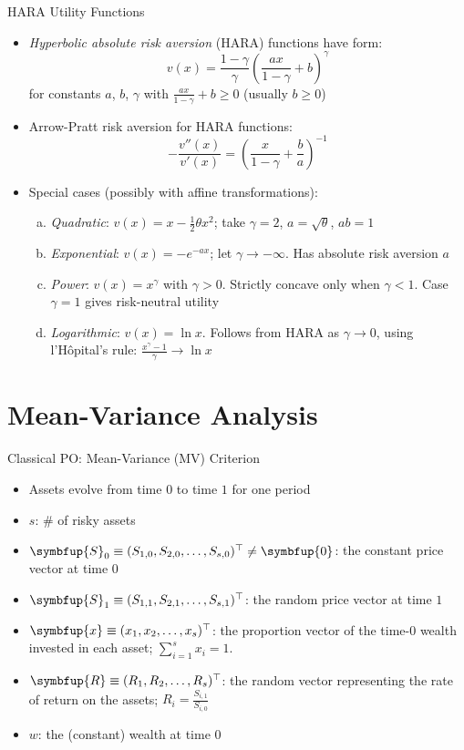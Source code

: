 \documentclass[10pt,handout]{beamer}
\newcommand{\ds}{\displaystyle}
\newcommand{\vx}{\symbfup{x}}
\newcommand{\vS}{\symbfup{S}}
\newcommand{\vR}{\symbfup{R}}
\newcommand{\vZero}{\symbfup{0}}
\theoremstyle{definition}
\begin{document}
\begin{frame}{HARA Utility Functions}
  \begin{itemize}[<+->]
    \item \emph{Hyperbolic absolute risk aversion} (HARA) functions have form:
      \[v(x) = \frac{1-\gamma}{\gamma}\left(\frac{ax}{1-\gamma} + b\right)^\gamma\]
      for constants $a$, $b$, $\gamma$ with $\ds\frac{ax}{1-\gamma} + b \geqslant 0$ (usually $b \geqslant 0$)
    \item Arrow-Pratt risk aversion for HARA functions:
      \[-\frac{v''(x)}{v'(x)} = \left(\frac{x}{1-\gamma} + \frac{b}{a}\right)^{-1}\]
    \item Special cases (possibly with affine transformations):
      \begin{enumerate}[(a)]
        \item \emph{Quadratic}: $v(x) = x - \frac{1}{2}\theta x^2$; take $\gamma = 2$, $a = \sqrt{\theta}$, $ab = 1$
        \item \emph{Exponential}: $v(x) = -e^{-ax}$; let $\gamma \to -\infty$. Has absolute risk aversion $a$
        \item \emph{Power}: $v(x) = x^\gamma$ with $\gamma > 0$. Strictly concave only when $\gamma < 1$. Case $\gamma = 1$ gives risk-neutral utility
        \item \emph{Logarithmic}: $v(x) = \ln x$. Follows from HARA as $\gamma \to 0$, using l'Hôpital's rule: $\ds\frac{x^\gamma - 1}{\gamma} \to \ln x$
      \end{enumerate}
  \end{itemize}
\end{frame}

\section{Mean-Variance Analysis}

\begin{frame}{Classical PO: Mean-Variance (MV) Criterion}
  \begin{itemize}[<+->]
    \item Assets evolve from time $0$ to time $1$ for one period
    \item $s$: \# of risky assets 
    \item $\vS_0\equiv(S_{1, 0}, S_{2, 0}, \ldots, S_{s, 0})^\top\not=\vZero$: the constant price vector at time $0$
    \item $\vS_1\equiv(S_{1, 1}, S_{2, 1}, \ldots, S_{s, 1})^\top$: the random price vector at time $1$
    \item $\vx\equiv(x_1, x_2, \ldots, x_s)^\top$: the proportion vector of the time-$0$ wealth invested in each asset; $\ds\sum_{i=1}^s x_i = 1$.
    \item $\vR\equiv(R_1, R_2, \ldots, R_s)^\top$: the random vector representing the rate of return on the assets; $\ds R_i = \frac{S_{i, 1}}{S_{i, 0}}$
    \item $w$: the (constant) wealth at time $0$
  \end{itemize}
\end{frame}
\end{document}
